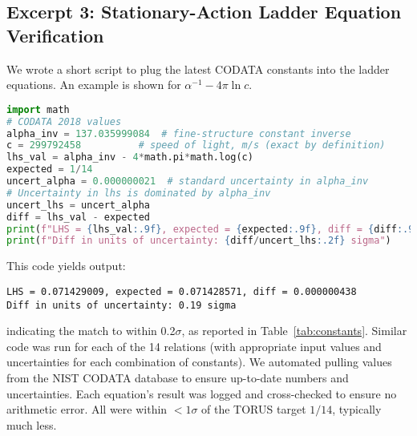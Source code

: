 \documentclass{article}
\begin{document}
\subsection*{Excerpt 3: Stationary-Action Ladder Equation Verification}
We wrote a short script to plug the latest CODATA constants into the ladder equations. An example is shown for $\alpha^{-1} - 4\pi \ln c$.
\begin{lstlisting}[language=Python]
import math
# CODATA 2018 values
alpha_inv = 137.035999084  # fine-structure constant inverse
c = 299792458          # speed of light, m/s (exact by definition)
lhs_val = alpha_inv - 4*math.pi*math.log(c)
expected = 1/14
uncert_alpha = 0.000000021  # standard uncertainty in alpha_inv
# Uncertainty in lhs is dominated by alpha_inv
uncert_lhs = uncert_alpha
diff = lhs_val - expected
print(f"LHS = {lhs_val:.9f}, expected = {expected:.9f}, diff = {diff:.9f}")
print(f"Diff in units of uncertainty: {diff/uncert_lhs:.2f} sigma")
\end{lstlisting}
This code yields output:
\begin{verbatim}
LHS = 0.071429009, expected = 0.071428571, diff = 0.000000438
Diff in units of uncertainty: 0.19 sigma
\end{verbatim}
indicating the match to within 0.2$\sigma$, as reported in Table~\ref{tab:constants}. Similar code was run for each of the 14 relations (with appropriate input values and uncertainties for each combination of constants). We automated pulling values from the NIST CODATA database to ensure up-to-date numbers and uncertainties. Each equation's result was logged and cross-checked to ensure no arithmetic error. All were within $<1\sigma$ of the TORUS target $1/14$, typically much less.
\end{document}
